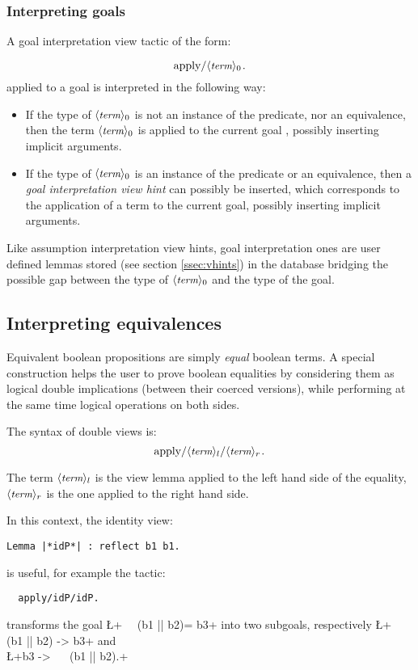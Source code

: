 \subsubsection*{Interpreting goals}
A goal interpretation view tactic of the form:

$$\C{apply/}\N{term}_0\C{.}$$
applied to a goal  is interpreted in the following way:
\begin{itemize}
\item If the type of $\langle\mbox{\itshape\rmfamily\small term}\rangle_0$ is not an instance of the
   predicate, nor an equivalence,
  then the term $\langle\mbox{\itshape\rmfamily\small term}\rangle_0$ is applied to the current goal ,
  possibly inserting implicit arguments.
\item If the type of $\langle\mbox{\itshape\rmfamily\small term}\rangle_0$ is an instance of the 
  predicate or an equivalence, then
a \emph{goal interpretation view hint} can possibly be inserted, which
corresponds to the application of a term
 to the current
goal, possibly inserting implicit arguments.
\end{itemize}

Like assumption interpretation view hints, goal interpretation ones
are user defined lemmas stored (see section \ref{ssec:vhints}) in the
 database bridging
the possible gap between the type of $\langle\mbox{\itshape\rmfamily\small term}\rangle_0$ and the type of the
goal.


\subsection{Interpreting equivalences}
Equivalent boolean propositions are simply \emph{equal} boolean terms.
A special construction helps the user to prove boolean equalities by
considering them as logical double implications (between their coerced
versions), while
performing at the same time logical operations on both sides.

The syntax of double views is:
$$\C{apply/}\N{term}_l\C{/}\N{term}_r\C{.}$$

The term $\langle\mbox{\itshape\rmfamily\small term}\rangle_l$ is the view lemma applied to the left hand side of the
equality, $\langle\mbox{\itshape\rmfamily\small term}\rangle_r$ is the one applied to the right hand side.

In this context, the identity view:
\begin{lstlisting}
Lemma |*idP*| : reflect b1 b1.
\end{lstlisting}
is useful, for example the tactic:
\begin{lstlisting}
  apply/idP/idP.
\end{lstlisting}
transforms the goal
\L+~~ (b1 || b2)= b3+
 into two subgoals, respectively
 \L+~~  (b1 || b2) -> b3+ and \\
\L+b3 -> ~~  (b1 || b2).+


